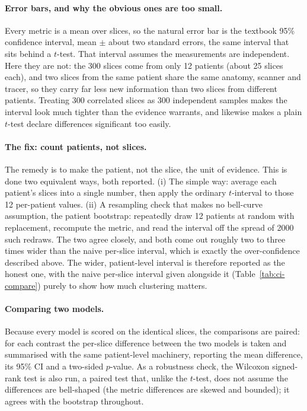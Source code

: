 \documentclass[11pt,a4paper]{article}
\newcommand{\num}[1]{#1}
\begin{document}
\paragraph{Error bars, and why the obvious ones are too small.} Every metric is a mean over
slices, so the natural error bar is the textbook 95\% confidence interval, mean $\pm$ about two
standard errors, the same interval that sits behind a $t$-test. That interval assumes the
measurements are independent. Here they are not: the \num{300} slices come from only \num{12}
patients (about \num{25} slices each), and two slices from the same patient share the same
anatomy, scanner and tracer, so they carry far less new information than two slices from
different patients. Treating \num{300} correlated slices as \num{300} independent samples makes
the interval look much tighter than the evidence warrants, and likewise makes a plain $t$-test
declare differences significant too easily.

\paragraph{The fix: count patients, not slices.} The remedy is to make the patient, not
the slice, the unit of evidence. This is done two equivalent ways, both reported. (i) The simple
way: average each patient's slices into a single number, then apply the ordinary $t$-interval to
those \num{12} per-patient values. (ii) A resampling check that makes no bell-curve assumption,
the patient bootstrap: repeatedly draw \num{12} patients at random with replacement,
recompute the metric, and read the interval off the spread of \num{2000} such redraws. The two
agree closely, and both come out roughly two to three times wider than the naive
per-slice interval, which is exactly the over-confidence described above. The wider,
patient-level interval is therefore reported as the honest one, with the naive per-slice interval
given alongside it (Table~\ref{tab:ci-compare}) purely to show how much clustering matters.

\paragraph{Comparing two models.} Because every model is scored on the identical slices, the
comparisons are paired: for each contrast the per-slice difference between the two
models is taken and summarised with the same patient-level machinery, reporting the mean
difference, its 95\% CI and a two-sided $p$-value. As a robustness check, the Wilcoxon
signed-rank test is also run, a paired test that, unlike the $t$-test, does not assume the
differences are bell-shaped (the metric differences are skewed and bounded); it agrees with the
bootstrap throughout.
\end{document}

